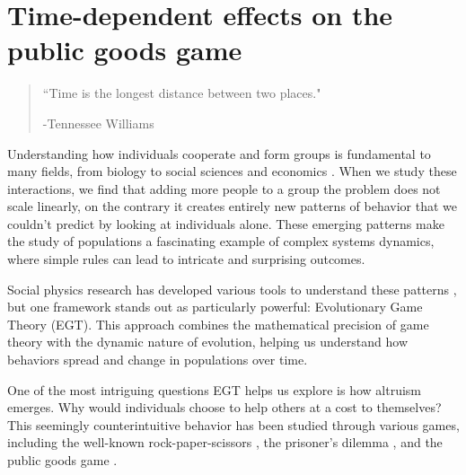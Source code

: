 \chapter{Time-dependent effects on the public goods game} %
\label{chap:TimeEffects}



\begin{quotation}

	\vspace{-3cm}

    \begin{flushright}
    \begin{minipage}[t][5cm][b]{0.5\textwidth}
    { ``Time is the longest distance between two places."}
    
    \bigskip
    
    -{\small  Tennessee Williams}
    \end{minipage}
    \end{flushright}
    
    \vspace{0.5cm}
\end{quotation}




Understanding how individuals cooperate and form groups is fundamental to many fields, from biology to social sciences and economics \cite{CoopBio,CoopSocial,CoopEconomy}. When we study these interactions, we find that adding more people to a group the problem does not scale linearly, on the contrary it creates entirely new patterns of behavior that we couldn't predict by looking at individuals alone. These emerging patterns make the study of populations a fascinating example of complex systems dynamics, where simple rules can lead to intricate and surprising outcomes.

Social physics research has developed various tools to understand these patterns \cite{SocialPhy}, but one framework stands out as particularly powerful: Evolutionary Game Theory (EGT). This approach combines the mathematical precision of game theory with the dynamic nature of evolution, helping us understand how behaviors spread and change in populations over time.

One of the most intriguing questions EGT helps us explore is how altruism emerges. Why would individuals choose to help others at a cost to themselves? This seemingly counterintuitive behavior has been studied through various games, including the well-known rock-paper-scissors \cite{RPSCooperation}, the prisoner's dilemma \cite{Prisionero}, and the public goods game \cite{PublicGoods}.


